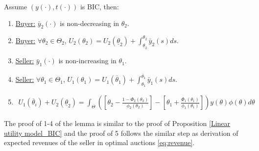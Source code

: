 \documentclass[11pt]{elegantbook}
\begin{document}
\begin{lemma}
    Assume $(y(\cdot),t(\cdot))$ is BIC, then:
    \begin{enumerate}
        \item \underline{Buyer:} $\bar{y}_2(\cdot)$ is non-decreasing in $\theta_2$.
        \item \underline{Buyer:} $\forall \theta_2\in\Theta_2$, $U_2(\theta_2)=U_2(\underline{\theta}_2)+\int_{\underline{\theta}_2}^{\theta_2}\bar{y}_2(s)ds$.
        \item \underline{Seller:} $\bar{y}_1(\cdot)$ is non-increasing in $\theta_1$.
        \item \underline{Seller:} $\forall \theta_1\in\Theta_1$, $U_1(\theta_1)=U_1(\overline{\theta}_1)+\int_{\theta_1}^{\overline{\theta}_1}\bar{y}_1(s)ds$.
        \item
        \begin{equation}
            \begin{aligned}
                U_1(\overline{\theta}_i)+U_2(\underline{\theta}_2)=\int_\Theta \left(\left[\theta_2-\frac{1-\Phi_2(\theta_2)}{\phi_2(\theta_2)}\right]-\left[\theta_1+\frac{\Phi_1(\theta_1)}{\phi_1(\theta_1)}\right]\right)y(\theta)\phi(\theta)d\theta
            \end{aligned}
            \nonumber
        \end{equation}
    \end{enumerate}
\end{lemma}
The proof of 1-4 of the lemma is similar to the proof of Proposition \ref{Linear utility model_BIC} and the proof of 5 follows the similar step as derivation of expected revenues of the seller in optimal auctions \eqref{eq:revenue}.
\end{document}
